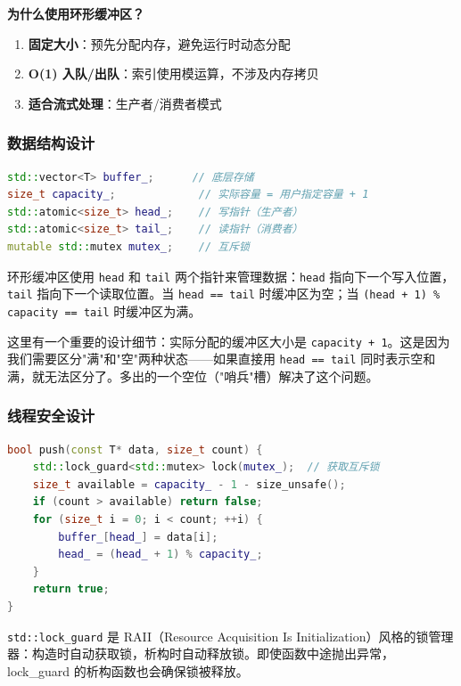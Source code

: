 ﻿\documentclass[12pt,a4paper,oneside]{ctexbook}
\begin{document}
\textbf{为什么使用环形缓冲区？}
\begin{enumerate}
    \item \textbf{固定大小}：预先分配内存，避免运行时动态分配
    \item \textbf{O(1) 入队/出队}：索引使用模运算，不涉及内存拷贝
    \item \textbf{适合流式处理}：生产者/消费者模式
\end{enumerate}

\subsubsection{数据结构设计}

\begin{lstlisting}[language=C++, caption={RingBuffer 的数据成员}]
std::vector<T> buffer_;      // 底层存储
size_t capacity_;             // 实际容量 = 用户指定容量 + 1
std::atomic<size_t> head_;    // 写指针（生产者）
std::atomic<size_t> tail_;    // 读指针（消费者）
mutable std::mutex mutex_;    // 互斥锁
\end{lstlisting}

环形缓冲区使用 \texttt{head} 和 \texttt{tail} 两个指针来管理数据：\texttt{head} 指向下一个写入位置，\texttt{tail} 指向下一个读取位置。当 \texttt{head == tail} 时缓冲区为空；当 \texttt{(head + 1) \% capacity == tail} 时缓冲区为满。

这里有一个重要的设计细节：实际分配的缓冲区大小是 \texttt{capacity + 1}。这是因为我们需要区分"满"和"空"两种状态——如果直接用 \texttt{head == tail} 同时表示空和满，就无法区分了。多出的一个空位（"哨兵"槽）解决了这个问题。

\subsubsection{线程安全设计}

\begin{lstlisting}[language=C++, caption={RingBuffer 的线程安全机制}]
bool push(const T* data, size_t count) {
    std::lock_guard<std::mutex> lock(mutex_);  // 获取互斥锁
    size_t available = capacity_ - 1 - size_unsafe();
    if (count > available) return false;
    for (size_t i = 0; i < count; ++i) {
        buffer_[head_] = data[i];
        head_ = (head_ + 1) % capacity_;
    }
    return true;
}
\end{lstlisting}

\texttt{std::lock\_guard} 是 RAII（Resource Acquisition Is Initialization）风格的锁管理器：构造时自动获取锁，析构时自动释放锁。即使函数中途抛出异常，lock\_guard 的析构函数也会确保锁被释放。
\end{document}

